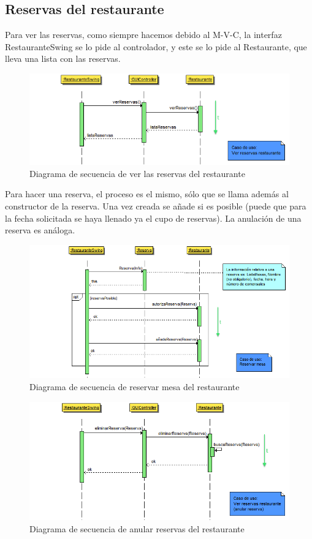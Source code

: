 \documentclass[spanish,a4paper,11pt, twoside]{report}	%
\begin{document}
		\subsection{Reservas del restaurante}
		Para ver las reservas,  como siempre hacemos debido al M-V-C, la interfaz RestauranteSwing se lo pide al controlador, y este se lo pide al Restaurante, que lleva una lista con las reservas.
		\begin{figure}[!h]
		\centering
		\includegraphics[scale=0.5]{DSverreservas.png}
		\caption{Diagrama de secuencia de ver las reservas del restaurante}
		\end{figure}

		Para hacer una reserva, el proceso es el mismo, sólo que se llama además al constructor de la reserva. Una vez creada se añade si es posible (puede que para la fecha solicitada se haya llenado ya el cupo de reservas). La anulación de una reserva es análoga.
		\begin{figure}[!h]
		\centering
		\includegraphics[scale=0.5]{DSreservarmesa.png}
		\caption{Diagrama de secuencia de reservar mesa del restaurante}
		\end{figure}

		\begin{figure}[!h]
		\centering
		\includegraphics[scale=0.5]{DSanularreserva.png}
		\caption{Diagrama de secuencia de anular reservas del restaurante}
		\end{figure}
\end{document}
